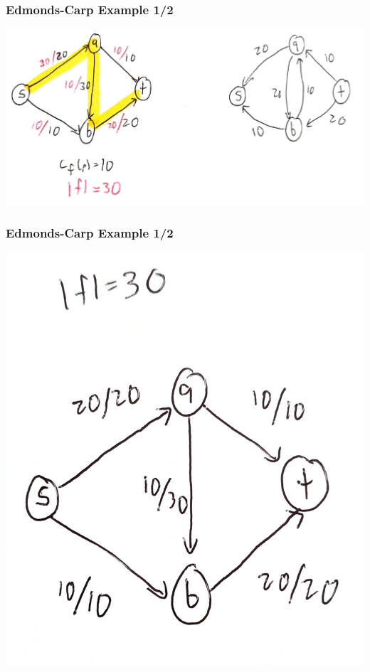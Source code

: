 \documentclass{beamer}
\begin{document}
\begin{frame} \frametitle{Edmonds-Carp Example 1/2}
\begin{center}
  \includegraphics[scale=.12]{ek-1-4.jpg}
\end{center}
\end{frame}

\begin{frame} \frametitle{Edmonds-Carp Example 1/2}
\begin{center}
  \includegraphics[scale=.12]{ek-1-5.jpg}
\end{center}
\end{frame}
\end{document}
